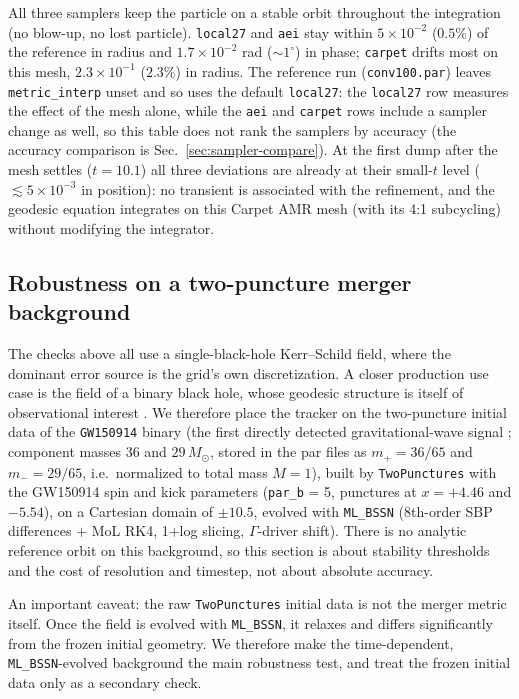 \documentclass[11pt]{article}
\begin{document}
All three samplers keep the particle on a stable orbit throughout the
integration (no blow-up, no lost particle).  \texttt{local27} and \texttt{aei}
stay within $5\times10^{-2}$ ($0.5\%$) of the reference in radius and
$1.7\times10^{-2}$ rad ($\sim1^\circ$) in phase; \texttt{carpet} drifts most
on this mesh, $2.3\times10^{-1}$ ($2.3\%$) in radius.  The reference run
(\texttt{conv100.par}) leaves \texttt{metric\_interp} unset and so uses the
default \texttt{local27}: the \texttt{local27} row measures the effect of the
mesh alone, while the \texttt{aei} and \texttt{carpet} rows include a sampler
change as well, so this table does not rank the samplers by accuracy (the accuracy
comparison is Sec.~\ref{sec:sampler-compare}).  At the first dump after the mesh
settles ($t=10.1$) all three deviations are already at their small-$t$ level
($\lesssim5\times10^{-3}$ in position): no transient is associated with the
refinement, and the geodesic equation integrates on this Carpet AMR mesh (with
its 4:1 subcycling) without modifying the integrator.

\subsection{Robustness on a two-puncture merger background}\label{sec:gw150914}

The checks above all use a single-black-hole Kerr--Schild field, where the
dominant error source is the grid's own discretization.  A closer production use
case is the field of a binary black hole, whose geodesic structure is itself of
observational interest \citep{chernov2024}.  We therefore place the tracker on
the two-puncture initial data of the \texttt{GW150914} binary (the first
directly detected gravitational-wave signal \citep{abbott2016gw150914};
component masses $36$ and $29\,M_\odot$, stored in the par files as
$m_+ = 36/65$ and $m_- = 29/65$, i.e.\ normalized to total mass $M = 1$), built
by \texttt{TwoPunctures} with the GW150914 spin and kick parameters
(\texttt{par\_b} = 5, punctures at $x = +4.46$ and $-5.54$), on a Cartesian
domain of $\pm10.5$, evolved with \texttt{ML\_BSSN} (8th-order SBP differences
$+$ MoL RK4, 1+log slicing, $\Gamma$-driver shift).  There is no analytic
reference orbit on this background, so this section is about stability
thresholds and the cost of resolution and timestep, not about absolute
accuracy.

An important caveat: the raw \texttt{TwoPunctures} initial data is not the
merger metric itself.  Once the field is evolved with \texttt{ML\_BSSN}, it
relaxes and differs significantly from the frozen initial geometry.  We
therefore make the time-dependent, \texttt{ML\_BSSN}-evolved background the main
robustness test, and treat the frozen initial data only as a secondary check.
\end{document}
